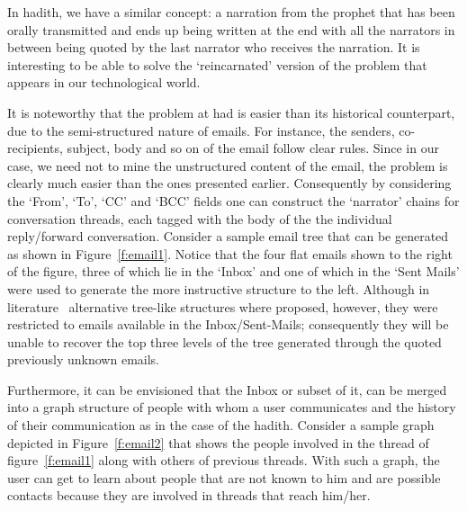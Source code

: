 \documentclass[11pt]{article}
\begin{document}
In hadith, we have a similar concept: a narration from the prophet that has been orally transmitted and ends up being written
at the end with all the narrators in between being quoted by the last narrator who receives the narration. 
It is interesting to be able to solve the `reincarnated' version of
the problem that appears in our technological world.

It is noteworthy that the problem at had is easier than its historical counterpart, due to the semi-structured nature of emails.
For instance, the senders, co-recipients, subject, body and so on of the email follow clear rules. Since in our case, we need not 
to mine the unstructured content of the email, the problem is clearly much easier than the ones presented earlier. 
Consequently by considering the `From', `To', `CC' and `BCC' fields one can construct the `narrator' chains for conversation
threads, each tagged with the body of the the individual reply/forward conversation. Consider a sample email tree that
can be generated as shown in Figure~\ref{f:email1}. Notice that the four flat emails shown to the right of the figure,
three of which lie in the `Inbox' and one of which in the `Sent Mails' were used to generate the more instructive structure
to the left. Although in literature~\cite{Smith:00,Venolia:03} 
alternative tree-like structures where proposed, however, they were restricted to emails
available in the Inbox/Sent-Mails; consequently they will be unable to recover the top three levels of the tree generated through 
the quoted previously unknown emails. %

Furthermore, it can be envisioned that the Inbox or subset of it, can be merged into a graph structure of people with 
whom a user communicates and the
history of their communication as in the case of the hadith. 
Consider a sample graph depicted in Figure~\ref{f:email2} 
that shows the people involved in the thread of figure~\ref{f:email1} along with others of previous threads.
With such a graph, the user can get to learn about people that are not known to him and are possible contacts because they are involved 
in threads that reach him/her.

\end{document}
